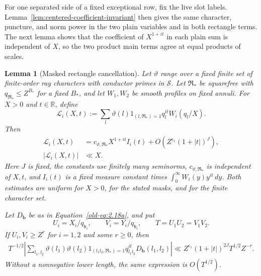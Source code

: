 \documentclass[11pt,a4paper]{article}
\numberwithin{equation}{section}
\numberwithin{figure}{section}
\newtheorem{lemma}[theorem]{Lemma}
\theoremstyle{definition}
\theoremstyle{remark}
\begin{document}
For one separated side of a fixed exceptional row, fix the live slot
labels.  Lemma~\ref{lem:centered-coefficient-invariant} then gives the same
character, puncture, and norm power in the two plain variables and in both
rectangle terms.  The next lemma shows that the coefficient of \(X^{1+it}\)
in each plain sum is independent of \(X\), so the two product main terms
agree at equal products of scales.

\begin{lemma}[Masked rectangle cancellation]
\label{lem:centered-lattice-cancellation}
Let \(\vartheta\) range over a fixed finite set of finite-order
ray characters with conductor primes in \(\mathcal S\).  Let
\(\mathfrak R_*\) be squarefree with \(q_{\mathfrak R_*}\le Z^{B_*}\)
for a fixed \(B_*\), and let \(W_1,W_2\) be smooth profiles on
fixed annuli.  For \(X>0\) and \(t\in\mathbb R\), define
\[
 \mathcal L_i(X,t):=
 \sum_l\vartheta(l)1_{(l,\mathfrak R_*)=1}
           q_l^{it}W_i(q_l/X).
\]
Then
\begin{align}
 \mathcal L_i(X,t)
 &=c_{\vartheta,\mathfrak R_*}X^{1+it}I_i(t)
   +O\left(Z^{\epsilon_1}(1+|t|)^J\right),
 \label{old-eq:2.18d}\\
 |\mathcal L_i(X,t)|&\ll X.
 \label{old-eq:2.18e}
\end{align}
Here \(J\) is fixed, the constants use finitely many seminorms,
\(c_{\vartheta,\mathfrak R_*}\) is independent of \(X,t\), and
\(I_i(t)\) is a fixed measure constant times
\(\int_0^\infty W_i(y)y^{it}\,dy\).
Both estimates are uniform for \(X>0\), for the stated masks, and
for the finite character set.

Let \(D_{\mathbf b}\) be as in
Equation~\eqref{old-eq:2.18a}, and put
\[
 U_i=X_i/q_{\mathfrak b_i},\qquad
 V_i=Y_i/q_{\mathfrak b_i},\qquad
 T=U_1U_2=V_1V_2.
\]
If \(U_i,V_i\ge Z^r\) for \(i=1,2\) and some \(r\ge0\),
then
\begin{equation}
 \begin{split}
 T^{-1/2}\left|
 \sum_{l_1,l_2}
 \vartheta(l_1)\vartheta(l_2)
 1_{(l_1l_2,\mathfrak R_*)=1}
 q_{l_1l_2}^{it}D_{\mathbf b}(l_1,l_2)
 \right|
 \ll Z^{\epsilon_1}(1+|t|)^{2J}T^{1/2}Z^{-r}.
 \end{split}
 \label{old-eq:2.18f}
\end{equation}
Without a nonnegative lower length, the same expression is
\(O(T^{1/2})\).
\end{lemma}
\end{document}
